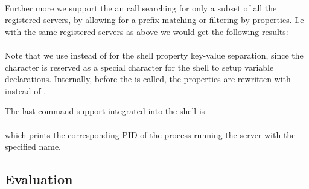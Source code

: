\paragraph{}

Further more we support the an  call searching for only a subset of all the registered servers, by allowing for a prefix matching or filtering by properties. I.e with the same registered servers as above we would get the following results:
\newline

\begin{mdframed}[style=shell]



\color{black}
\end{mdframed}
\newline
\paragraph{}

\paragraph{}
Note that we use  instead of  for the shell property key-value separation, since the character  is reserved as a special character for the shell to setup variable declarations. Internally, before the  is called, the properties are rewritten with  instead of .


The last command support integrated into the shell is  
\begin{mdframed}[style=shell]
\end{mdframed}
\paragraph{}
which prints the corresponding PID of the process running the server with the specified name.

\subsection{Evaluation} \label{ns_eval}

